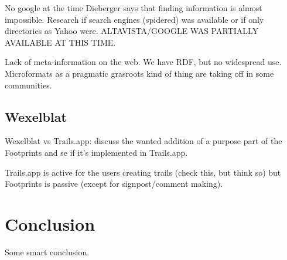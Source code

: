 \documentclass[12pt,a4paper]{article}
\begin{document}
No google at the time Dieberger says that finding information is almost
impossible. Research if search engines (spidered) was available or if only
directories as Yahoo were. ALTAVISTA/GOOGLE WAS PARTIALLY AVAILABLE AT THIS
TIME.

Lack of meta-information on the web. We have RDF, but no widespread use.
Microformats as a pragmatic grasroots kind of thing are taking off in some
communities.


\subsection{Wexelblat}

Wexelblat vs Trails.app: discuss the wanted addition of a purpose part of the
Footprints and se if it's implemented in Trails.app.

Trails.app is active for the users creating trails (check this, but think so)
but Footprints is passive (except for signpost/comment making).

\section{Conclusion}

Some smart conclusion.

\section{}




\end{document}
